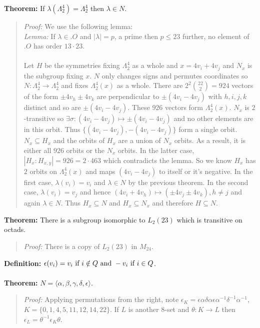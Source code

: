 {\bf Theorem:}
If $\lambda(\Lambda_2^4)= \Lambda_2^4$ then
$\lambda \in N$.
\begin{quote}
\emph{Proof:}
We use the following lemma:
\\
\emph{Lemma:} If $\lambda \in .O$ and $|\lambda|= p$, a prime then $p \le 23$ further,
no element of $.O$ has order $13 \cdot 23$.
\\
\\
Let $H$ be the symmetries fixing $\Lambda_2^4$ as a whole and $x= 4v_i +4v_j$
and $N_x$ is the subgroup fixing $x$.  $N$ only changes signs and permutes
coordinates so $N: \Lambda_2^4 \rightarrow \Lambda_2^4$ and fixes
$\Lambda_2^4(x)$ as a whole.  There are $2^2 {22 \choose 2}= 924$ vectors
of the form $\pm 4 v_h \pm 4 v_k$ are perpendicular to 
$\pm(4 v_i - 4 v_j)$ with
$h, i, j,k$ distinct and so are
$\pm(4 v_i - 4 v_j)$.  These $926$ vectors form
$\Lambda_2^4(x)$.  $N_x$ is $2$-transitive so $\exists \sigma: 
(4 v_i - 4 v_j) \mapsto \pm (4 v_i - 4 v_j) $ and no other elements are in this orbit.
Thus $\{ (4 v_i - 4 v_j), -(4 v_i - 4 v_j) \} $ form a single orbit.
$N_x \subseteq H_x$ and the orbits of $H_x$ are a union of $N_x$ orbits.  As a result,
it is either all $926$ orbits or the $N_x$ orbits.  In the latter case,
$|H_x: H_{x,y}| = 926= 2 \cdot 463$ which contradicts the lemma.
So we know $H_x$ has $2$ orbits on $\Lambda_2^4(x)$ and maps 
$(4 v_i - 4 v_j)$ to itself or it's negative.  In the first case, $\lambda(v_i)= v_i$ and
$\lambda \in N$ by the
previous theorem.  In the second case, $\lambda( v_i)= v_j$ and hence
$ (4 v_i + 4 v_h)  \mapsto (\pm 4 v_j \pm 4 v_k) , h \ne j $ and again $\lambda \in N$.  Thus
$H_x \subseteq N$ and $H_x \subseteq N_x$ and therefore $H \subseteq N$.
\end{quote}
{\bf Theorem:}
There is a subgroup isomorphic to $L_2(23)$ which is
transitive on octads. 
\begin{quote}
\emph{Proof:} 
There is a copy of $L_2(23)$ in $M_{24}$.
\end{quote}
{\bf Definition:} $\epsilon(v_i) = 
v_i \textnormal{ if } i \notin Q \textnormal{ and } -v_i \textnormal{ if } i \in Q $.
\\
\\
{\bf Theorem:} $N= \langle \alpha, \beta, \gamma, \delta, \epsilon \rangle$.
\begin{quote}
\emph{Proof:} 
Applying permutations from the right, note $\epsilon_K= 
\epsilon \alpha  \delta \alpha  \epsilon \alpha^{-1} \delta^{-1} \alpha^{-1}$, 
$K= \{ 0,1,4,5,11,12,14,22 \}$.  If $L$ is another $8$-set and $\theta: K \rightarrow L$ then
$\epsilon_L = \theta^{-1} \epsilon_K \theta$.
\end{quote}
